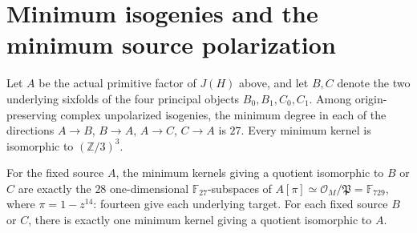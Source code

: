 \section{Minimum isogenies and the minimum source polarization}
\begin{proposition}
\label{pp:prop:fermatbcminimum}
Let $A$ be the actual primitive factor of $J(H)$ above, and let
$B,C$ denote the two underlying sixfolds of the four principal objects
$B_0,B_1,C_0,C_1$. Among origin-preserving complex unpolarized
isogenies, the minimum degree in each of the directions
$A\to B$, $B\to A$, $A\to C$, $C\to A$ is $27$.
Every minimum kernel is isomorphic to $(\mathbb Z/3)^3$.

For the fixed source $A$, the minimum kernels giving a quotient
isomorphic to $B$ or $C$ are exactly the $28$ one-dimensional
$\mathbb F_{27}$-subspaces of
$A[\pi]\simeq\mathcal O_M/\mathfrak P=\mathbb F_{729}$,
where $\pi=1-z^{14}$: fourteen give each underlying target.
For each fixed source $B$ or $C$, there is exactly one minimum
kernel giving a quotient isomorphic to $A$.
\end{proposition}
